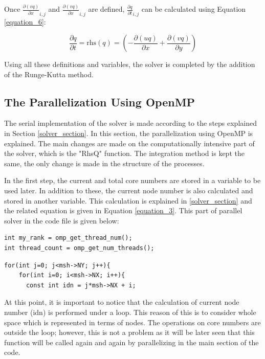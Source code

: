 \documentclass{article}
\begin{document}
Once $\frac{\partial (vq)}{\partial x}_{i,j}$ and $\frac{\partial (vq)}{\partial x}_{i,j}$ are defined, $\frac{\partial q}{\partial t}_{i,j}$ can be calculated using Equation \ref{equation_6}:             

\begin{equation} %
    \frac{\partial q}{\partial t} = \text{rhs}(q) = \left(-\frac{\partial (uq)}{\partial x} + \frac{\partial (vq)}{\partial y}\right) 
    \label{equation_6}
\end{equation}

Using all these definitions and variables, the solver is completed by the addition of the Runge-Kutta method. 
\label{solver_section}

\subsection{The Parallelization Using OpenMP}
The serial implementation of the solver is made according to the steps explained in Section \ref{solver_section}. In this section, the parallelization using OpenMP is explained. The main changes are made on the computationally intensive part of the solver, which is the "RhsQ" function. The integration method is kept the same, the only change is made in the structure of the processes. 

In the first step, the current and total core numbers are stored in a variable to be used later. In addition to these, the current node number is also calculated and stored in another variable. This calculation is explained in \ref{solver_section} and the related equation is given in Equation \ref{equation_3}. This part of parallel solver in the code file is given below: 
\begin{verbatim}
int my_rank = omp_get_thread_num();
int thread_count = omp_get_num_threads();
\end{verbatim}

\begin{verbatim}
for(int j=0; j<msh->NY; j++){
    for(int i=0; i<msh->NX; i++){
      const int idn = j*msh->NX + i; 
\end{verbatim}

At this point, it is important to notice that the calculation of current node number (idn) is performed under a loop. This reason of this is to consider whole space which is represented in terms of nodes. The operations on core numbers are outside the loop; however, this is not a problem as it will be later seen that this function will be called again and again by parallelizing in the main section of the code. 
\end{document}
